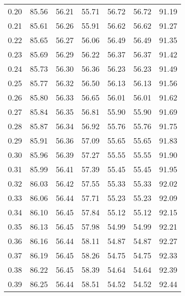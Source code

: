 \begin{tabular}{|c|c|c|c|c|c|c|}
      0.20 &     85.56 &     56.21 &      55.71 &   56.72 &      56.72 &         91.19 \\
      0.21 &     85.61 &     56.26 &      55.91 &   56.62 &      56.62 &         91.27 \\
      0.22 &     85.65 &     56.27 &      56.06 &   56.49 &      56.49 &         91.35 \\
      0.23 &     85.69 &     56.29 &      56.22 &   56.37 &      56.37 &         91.42 \\
      0.24 &     85.73 &     56.30 &      56.36 &   56.23 &      56.23 &         91.49 \\
      0.25 &     85.77 &     56.32 &      56.50 &   56.13 &      56.13 &         91.56 \\
      0.26 &     85.80 &     56.33 &      56.65 &   56.01 &      56.01 &         91.62 \\
      0.27 &     85.84 &     56.35 &      56.81 &   55.90 &      55.90 &         91.69 \\
      0.28 &     85.87 &     56.34 &      56.92 &   55.76 &      55.76 &         91.75 \\
      0.29 &     85.91 &     56.36 &      57.09 &   55.65 &      55.65 &         91.83 \\
      0.30 &     85.96 &     56.39 &      57.27 &   55.55 &      55.55 &         91.90 \\
      0.31 &     85.99 &     56.41 &      57.39 &   55.45 &      55.45 &         91.95 \\
      0.32 &     86.03 &     56.42 &      57.55 &   55.33 &      55.33 &         92.02 \\
      0.33 &     86.06 &     56.44 &      57.71 &   55.23 &      55.23 &         92.09 \\
      0.34 &     86.10 &     56.45 &      57.84 &   55.12 &      55.12 &         92.15 \\
      0.35 &     86.13 &     56.45 &      57.98 &   54.99 &      54.99 &         92.21 \\
      0.36 &     86.16 &     56.44 &      58.11 &   54.87 &      54.87 &         92.27 \\
      0.37 &     86.19 &     56.45 &      58.26 &   54.75 &      54.75 &         92.33 \\
      0.38 &     86.22 &     56.45 &      58.39 &   54.64 &      54.64 &         92.39 \\
      0.39 &     86.25 &     56.44 &      58.51 &   54.52 &      54.52 &         92.44 \\

\end{tabular}
